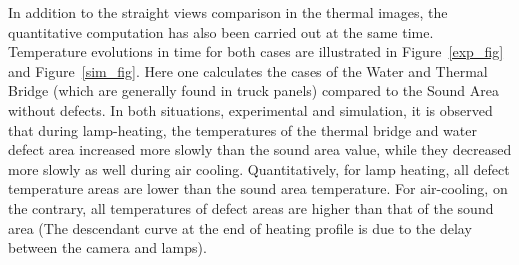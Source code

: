 \documentclass{tQRT2e}
\begin{document}
In addition to the straight views comparison in the thermal images, the quantitative computation has also been carried out at the same time. Temperature evolutions in time for both cases are illustrated in Figure~\ref{exp_fig} and Figure~\ref{sim_fig}. Here one calculates the cases of the Water and Thermal Bridge (which are generally found in truck panels) compared to the Sound Area without defects. In both situations, experimental and simulation, it is observed that during lamp-heating, the temperatures of the thermal bridge and water defect area increased more slowly than the sound area value, while they decreased more slowly as well during air cooling. Quantitatively, for lamp heating, all defect temperature areas are lower than the sound area temperature. For air-cooling, on the contrary, all temperatures of defect areas are higher than that of the sound area (The descendant curve at the end of heating profile is due to the delay between the camera and lamps).  
\end{document}
